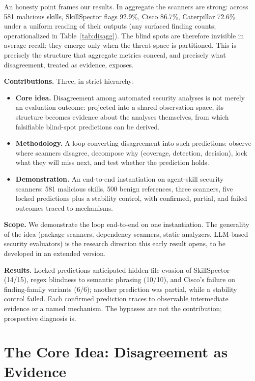 \documentclass[sigconf,nonacm]{acmart}
\begin{document}
An honesty point frames our results.
In aggregate the scanners are strong: across 581 malicious skills, SkillSpector flags 92.9\%, Cisco 86.7\%, Caterpillar 72.6\% under a uniform reading of their outputs (any surfaced finding counts; operationalized in Table~\ref{tab:disagg}).
The blind spots are therefore invisible in average recall; they emerge only when the threat space is partitioned.
This is precisely the structure that aggregate metrics conceal, and precisely what disagreement, treated as evidence, exposes.

\noindent\textbf{Contributions.} Three, in strict hierarchy:
\begin{itemize}
  \item \textbf{Core idea.} Disagreement among automated security analyses is not merely an evaluation outcome: projected into a shared observation space, its structure becomes evidence about the analyses themselves, from which falsifiable blind-spot predictions can be derived.
  \item \textbf{Methodology.} A loop converting disagreement into such predictions: observe where scanners disagree, decompose why (coverage, detection, decision), lock what they will miss next, and test whether the prediction holds.
  \item \textbf{Demonstration.} An end-to-end instantiation on agent-skill security scanners: 581 malicious skills, 500 benign references, three scanners, five locked predictions plus a stability control, with confirmed, partial, and failed outcomes traced to mechanisms.
\end{itemize}

\noindent\textbf{Scope.} We demonstrate the loop end-to-end on one instantiation.
The generality of the idea (package scanners, dependency scanners, static analyzers, LLM-based security evaluators) is the research direction this early result opens, to be developed in an extended version.

\noindent\textbf{Results.} Locked predictions anticipated hidden-file evasion of SkillSpector (14/15), regex blindness to semantic phrasing (10/10), and Cisco's failure on finding-family variants (6/6); another prediction was partial, while a stability control failed. Each confirmed prediction traces to observable intermediate evidence or a named mechanism. The bypasses are not the contribution; prospective diagnosis is.

\section{The Core Idea: Disagreement as Evidence}
\label{sec:idea}
\end{document}
